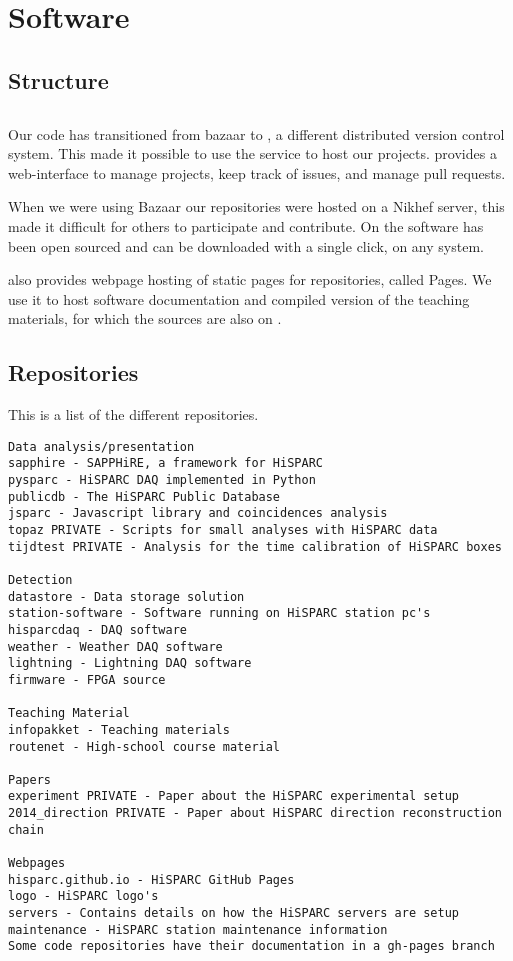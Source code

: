 \chapter{Software}
\label{ch:software}

\section{Structure}


\section{\github}

Our code has transitioned from bazaar to \git, a different distributed
version control system. This made it possible to use the service \github
to host our projects. \github provides a web-interface to manage
projects, keep track of issues, and manage pull requests.

When we were using Bazaar our repositories were hosted on a Nikhef
server, this made it difficult for others to participate and contribute.
On \github the software has been open sourced and can be downloaded with
a single click, on any system.

\github also provides webpage hosting of static pages for repositories,
called \github Pages. We use it to host software documentation and
compiled version of the teaching materials, for which the sources are
also on \github.


\section{Repositories}

This is a list of the different repositories.

\begin{verbatim}
Data analysis/presentation
sapphire - SAPPHiRE, a framework for HiSPARC
pysparc - HiSPARC DAQ implemented in Python
publicdb - The HiSPARC Public Database
jsparc - Javascript library and coincidences analysis
topaz PRIVATE - Scripts for small analyses with HiSPARC data
tijdtest PRIVATE - Analysis for the time calibration of HiSPARC boxes

Detection
datastore - Data storage solution
station-software - Software running on HiSPARC station pc's
hisparcdaq - DAQ software
weather - Weather DAQ software
lightning - Lightning DAQ software
firmware - FPGA source

Teaching Material
infopakket - Teaching materials
routenet - High-school course material

Papers
experiment PRIVATE - Paper about the HiSPARC experimental setup
2014_direction PRIVATE - Paper about HiSPARC direction reconstruction chain

Webpages
hisparc.github.io - HiSPARC GitHub Pages
logo - HiSPARC logo's
servers - Contains details on how the HiSPARC servers are setup
maintenance - HiSPARC station maintenance information
Some code repositories have their documentation in a gh-pages branch
\end{verbatim}

